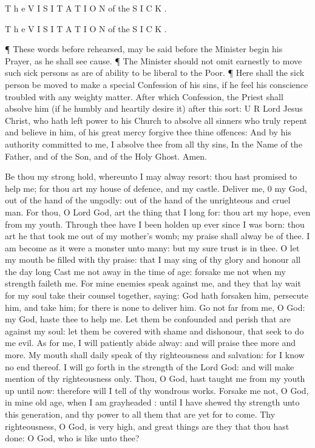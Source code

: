 T h e V I S I T A T I O N of the S I C K .

T h e V I S I T A T I O N of the S I C K .

¶ These words before rehearsed, may be said before the Minister begin his Prayer, as he shall see cause. ¶ The Minister should not omit earnestly to move such sick persons as are of ability to be liberal to the Poor. ¶ Here shall the sick person be moved to make a special Confession of his sins, if he feel his conscience troubled with any weighty matter. After which Confession, the Priest shall absolve him (if he humbly and heartily desire it) after this sort: U R Lord Jesus Christ, who hath left power to his Church to absolve all sinners who truly repent and believe in him, of his great mercy forgive thee thine offences: And by his authority committed to me, I absolve thee from all thy sins, In the Name of the Father, and of the Son, and of the Holy Ghost. Amen.

Be thou my strong hold, whereunto I may alway resort: thou hast promised to help me; for thou art my house of defence, and my castle. Deliver me, 0 my God, out of the hand of the ungodly: out of the hand of the unrighteous and cruel man. For thou, O Lord God, art the thing that I long for: thou art my hope, even from my youth. Through thee have I been holden up ever since I was born: thou art he that took me out of my mother’s womb; my praise shall alway be of thee. I am become as it were a monster unto many: but my sure trust is in thee. O let my mouth be filled with thy praise: that I may sing of thy glory and honour all the day long Cast me not away in the time of age: forsake me not when my strength faileth me. For mine enemies speak against me, and they that lay wait for my soul take their counsel together, saying: God hath forsaken him, persecute him, and take him; for there is none to deliver him. Go not far from me, O God: my God, haste thee to help me. Let them be confounded and perish that are against my soul: let them be covered with shame and dishonour, that seek to do me evil. As for me, I will patiently abide alway: and will praise thee more and more. My mouth shall daily speak of thy righteousness and salvation: for I know no end thereof. I will go forth in the strength of the Lord God: and will make mention of thy righteousness only. Thou, O God, hast taught me from my youth up until now: therefore will I tell of thy wondrous works. Forsake me not, O God, in mine old age, when I am grayheaded : until I have shewed thy strength unto this generation, and thy power to all them that are yet for to come. Thy righteousness, O God, is very high, and great things are they that thou hast done: O God, who is like unto thee?

